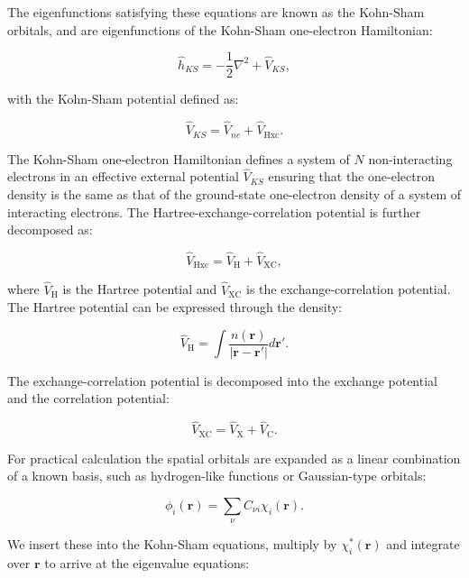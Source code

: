 The eigenfunctions satisfying these equations are known as the
Kohn-Sham orbitals, and are eigenfunctions of the Kohn-Sham
one-electron Hamiltonian:

\begin{equation}
 \hat{h}_{KS} = - \frac{1}{2} \nabla^2 + \hat{V}_{KS} , 
\end{equation}

with the Kohn-Sham potential defined as:

\begin{equation}
 \hat{V}_{KS} = \hat{V}_{ne} + \hat{V}_{\text{Hxc}} . 
\end{equation}

The Kohn-Sham one-electron Hamiltonian defines a system of $N$
non-interacting electrons in an effective external potential
$\hat{V}_{KS}$ ensuring that the one-electron density
is the same as that of the ground-state one-electron density
of a system of interacting electrons.
The Hartree-exchange-correlation potential is further
decomposed as:

\begin{equation}
\hat{V}_{\text{Hxc}} = \hat{V}_{\text{H}} + \hat{V}_{\text{XC}} ,
\end{equation}

where $\hat{V}_{\text{H}}$ is the Hartree potential and
$\hat{V}_{\text{XC}}$ is the exchange-correlation potential.
The Hartree potential can be expressed through the density:

\begin{equation}
\hat{V}_{\text{H}} = \int \frac{n(\bm{r})}{\left| \bm{r} -
    \bm{r}' \right|} d\bm{r}' .
\end{equation}

The exchange-correlation potential is decomposed
into the exchange potential and the correlation potential:

\begin{equation}
\hat{V}_{\text{XC}} = \hat{V}_{\text{X}} + \hat{V}_{\text{C}} .
\end{equation}

For practical calculation the 
spatial orbitals are expanded as a linear combination
of a known basis, such as hydrogen-like functions
or Gaussian-type orbitals:

\begin{equation}
 \phi_i(\bm{r}) = \sum_{\nu} C_{\nu i} \chi_i (\bm{r}) . 
\end{equation}

We insert these into the Kohn-Sham equations, multiply
by $\chi_i^*(\bm{r})$ and integrate over $\bm{r}$ to arrive
at the eigenvalue equations:

